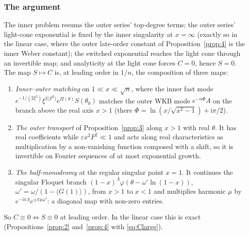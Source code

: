\documentclass{amsart}
\numberwithin{equation}{section}
\theoremstyle{plain}
\theoremstyle{definition}
\theoremstyle{remark}
\newcommand{\eps}{\varepsilon}
\newcommand{\iu}{\mathrm{i}}
\begin{document}
\subsubsection*{The argument}
The inner problem resums the outer series' top-degree terms; the outer series' light-cone exponential is fixed by the
inner singularity at $x = \infty$ (exactly so in the linear case, where the outer late-order constant of
Proposition~\ref{prop:4} is the inner Weber constant); the switched exponential reaches the light cone through an
invertible map; and analyticity at the light cone forces $C = 0$, hence $S = 0$. The map $S \mapsto C$ is, at leading
order in $1/n$, the composition of three maps:
\begin{enumerate}[label=(\arabic*),leftmargin=2em]
\item \emph{Inner--outer matching} on $1 \ll x \ll \sqrt n$, where the inner fast mode
$e^{-1/(2\xi^2)}\xi^{2\langle F^2\rangle}e^{\Pi(\theta)}S(\theta_0)$ matches the outer WKB mode $e^{-n\Phi}A$ on the branch above
the real axis $x > 1$ (there $\Phi = \ln(x/\sqrt{x^2-1}) + \iu\pi/2$).
\item \emph{The outer transport} of Proposition~\ref{prop:3} along $x > 1$ with real $\theta$. It has real coefficients
while $\eps x^2F^2 \ll 1$ and acts along real characteristics as multiplication by a non-vanishing function composed with a
shift, so it is invertible on Fourier sequences of at most exponential growth.
\item \emph{The half-monodromy} at the regular singular point $x = 1$. It continues the singular Floquet branch
$(1-x)^{\Lambda}\varphi(\theta - \omega'\ln(1-x))$, $\omega' = \omega/(1 - \langle G(1)\rangle)$, from $x > 1$ to $x < 1$ and
multiplies harmonic $\mu$ by $e^{-\iu\pi\Lambda}e^{\pm\pi\mu\omega'}$: a diagonal map with non-zero entries.
\end{enumerate}
So $C \equiv 0 \Leftrightarrow S \equiv 0$ at leading order. In the linear case this is exact
(Propositions~\ref{prop:2} and~\ref{prop:4} with \eqref{eq:Clarge}).
\end{document}

